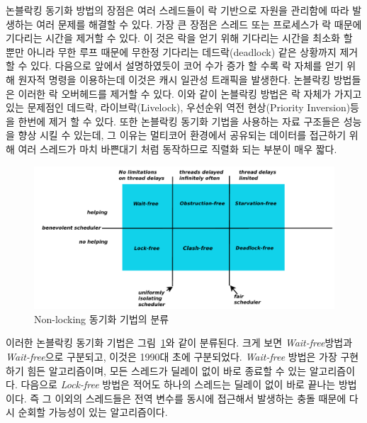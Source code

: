 논블락킹 동기화 방법의 장점은 여러 스레드들이 락 기반으로 자원을 관리함에 따라 
발생하는 여러 문제를 해결할 수 있다.
가장 큰 장점은 스레드 또는 프로세스가 락 때문에 기다리는 시간을 제거할 수 있다.
이 것은 락을 얻기 위해 기다리는 시간을 최소화 할 뿐만 아니라 무한 루프 때문에 무한정 기다리는 
데드락(deadlock) 같은 상황까지 제거 할 수 있다. 
다음으로 앞에서 설명하였듯이 코어 수가 증가 할 수록 락 자체를 얻기 위해 원자적 명령을 이용하는데 이것은 
캐시 일관성 트래픽을 발생한다. 
논블락킹 방법들은 이러한 락 오버헤드를 제거할 수 있다. 
이와 같이 논블락킹 방법은 락 자체가 가지고 있는 문제점인 데드락, 라이브락(Livelock), 
우선순위 역전 현상(Priority Inversion)등을 한번에 제거 할 수 있다. 
또한 논블락킹 동기화 기법을 사용하는  자료 구조들은 성능을 향상 시킬 수 있는데, 
그 이유는 멀티코어 환경에서 공유되는 데이터를 접근하기 위해 여러 스레드가 마치 바쁜대기 처럼 동작하므로 
직렬화 되는 부분이 매우 짧다.

\begin{figure}[h!]
    \centering
    \includegraphics[width=1\textwidth]{fig/NBS/NBS}
    \caption{Non-locking 동기화 기법의 분류}
  \label{fig:NBS}
\end{figure}


이러한 논블락킹 동기화 기법은 그림~\ref{fig:NBS}와 같이 분류된다.
크게 보면 \textit{Wait-free}방법과 \textit{Wait-free}으로 구분되고, 이것은 1990대 초에 구분되었다.  
\textit{Wait-free} 방법은 가장 구현하기 힘든 알고리즘이며, 모든 스레드가 딜레이 없이 바로 종료할 수 
있는 알고리즘이다. 
다음으로 \textit{Lock-free} 방법은 적어도 하나의 스레드는 딜레이 없이 바로 끝나는 방법이다. 
즉 그 이외의 스레드들은 전역 변수를 동시에 접근해서 발생하는 충돌 때문에 다시 순회할 가능성이 있는 
알고리즘이다.

